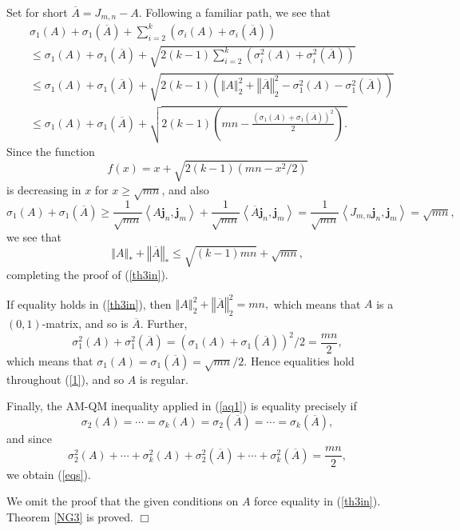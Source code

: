 \documentclass[12pt]{article}%
\newenvironment{proof}[1][Proof]{\noindent{\textbf {#1}  }}  {\hfill$\Box$\bigskip}
\begin{document}
\begin{proof}
Set for short $\overline{A}=J_{m,n}-A.$ Following a familiar path, we see
that
\begin{align}
&  \sigma_{1}\left(  A\right)  +\sigma_{1}(\overline{A})+%
{\displaystyle\sum\limits_{i=2}^{k}}
\left(  \sigma_{i}\left(  A\right)  +\sigma_{i}(\overline{A})\right)
\nonumber\\
&  \leq\sigma_{1}\left(  A\right)  +\sigma_{1}(\overline{A})+\sqrt{2\left(
k-1\right)
{\displaystyle\sum\limits_{i=2}^{k}}
\left(  \sigma_{i}^{2}\left(  A\right)  +\sigma_{i}^{2}(\overline{A})\right)
}\label{aq1}\\
&  \leq\sigma_{1}\left(  A\right)  +\sigma_{1}(\overline{A})+\sqrt{2\left(
k-1\right)  \left(  \left\Vert A\right\Vert _{2}^{2}+\left\Vert \overline
{A}\right\Vert _{2}^{2}-\sigma_{1}^{2}\left(  A\right)  -\sigma_{1}%
^{2}(\overline{A})\right)  }\nonumber\\
&  \leq\sigma_{1}\left(  A\right)  +\sigma_{1}(\overline{A})+\sqrt{2\left(
k-1\right)  \left(  mn-\frac{(\sigma_{1}\left(  A\right)  +\sigma
_{1}(\overline{A}))^{2}}{2}\right)  .}\nonumber
\end{align}
Since the function
\[
f(x)=x+\sqrt{2(k-1)\left(  mn-x^{2}/2\right)  }%
\]
is decreasing in $x$ for $x\geq\sqrt{mn}$, and also
\begin{equation}
\sigma_{1}(A)+\sigma_{1}(\overline{A})\geq\frac{1}{\sqrt{mn}}\left\langle
A\mathbf{j}_{n},\mathbf{j}_{m}\right\rangle +\frac{1}{\sqrt{mn}}\left\langle
\overline{A}\mathbf{j}_{n},\mathbf{j}_{m}\right\rangle =\frac{1}{\sqrt{mn}%
}\left\langle J_{m,n}\mathbf{j}_{n},\mathbf{j}_{m}\right\rangle =\sqrt{mn},
\label{1}%
\end{equation}
we see that
\[
\left\Vert A\right\Vert _{\ast}+\left\Vert \overline{A}\right\Vert _{\ast}%
\leq\sqrt{\left(  k-1\right)  mn}+\sqrt{mn},
\]
completing the proof of (\ref{th3in}).

If equality holds in (\ref{th3in}), then $\left\Vert A\right\Vert _{2}%
^{2}+\left\Vert \overline{A}\right\Vert _{2}^{2}=mn,$ which means that $A$ is
a $\left(  0,1\right)  $-matrix, and so is $\overline{A}$. Further,%
\[
\sigma_{1}^{2}\left(  A\right)  +\sigma_{1}^{2}(\overline{A})=(\sigma
_{1}\left(  A\right)  +\sigma_{1}(\overline{A}))^{2}/2=\frac{mn}{2},
\]
which means that $\sigma_{1}(A)=\sigma_{1}(\overline{A})=\sqrt{mn}/2.$ Hence
equalities hold throughout (\ref{1}), and so $A$ is regular.

Finally, the AM-QM inequality applied in (\ref{aq1}) is equality precisely if
\[
\sigma_{2}(A)=\cdots=\sigma_{k}(A)=\sigma_{2}(\overline{A})=\cdots=\sigma
_{k}(\overline{A}),
\]
and since
\[
\sigma_{2}^{2}(A)+\cdots+\sigma_{k}^{2}(A)+\sigma_{2}^{2}(\overline{A}%
)+\cdots+\sigma_{k}^{2}(\overline{A})=\frac{mn}{2},
\]
we obtain (\ref{eqs}).

We omit the proof that the given conditions on $A$ force equality in
(\ref{th3in}). Theorem \ref{NG3} is proved.
\end{proof}
\end{document}
